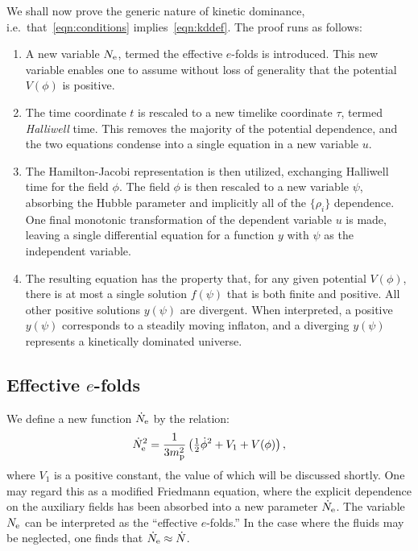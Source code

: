 We shall now prove the generic nature of kinetic dominance, i.e.\ that~\eqref{eqn:conditions} implies~\eqref{eqn:kddef}. The proof runs as follows:
%
\renewcommand{\theenumi}{\Alph{enumi}}
%
\begin{enumerate}
  \item                                        
    A new variable $N_\mathrm{e}$, termed the effective $e$-folds is introduced. This new variable enables one to assume without loss of generality that the potential $V(\phi)$ is positive.
  \item
    The time coordinate $t$ is rescaled to a new timelike coordinate $\tau$, termed {\em Halliwell\/} time. This removes the majority of the potential dependence, and the two equations condense into a single equation in a new variable $u$.
  \item
    The Hamilton-Jacobi representation is then utilized, exchanging Halliwell time for the field $\phi$. The field $\phi$ is then rescaled to a new variable $\psi$, absorbing the Hubble parameter and implicitly all of the $\{\rho_i\}$ dependence. One final monotonic transformation of the dependent variable $u$ is made, leaving a single differential equation for a function $y$ with $\psi$ as the independent variable.
  \item
    The resulting equation has the property that, for any given potential $V(\phi)$, there is at most a single solution $f(\psi)$ that is both finite and positive. All other positive solutions $y(\psi)$ are divergent.  When interpreted, a positive $y(\psi)$ corresponds to a steadily moving inflaton, and a diverging $y(\psi)$ represents a kinetically dominated universe.
\end{enumerate}
%


\subsection{Effective $e$-folds}
We define a new function $\dot{N}_\mathrm{e}$ by the relation:
%
\begin{equation}
  \dot{N}_\mathrm{e}^2 = 
  \frac{1}{3m_{\mathrm{p}}^2}\left({\textstyle\frac{1}{2}}\dot{\phi}^2 + V_1+V(\phi) \right),
  \label{eqn:Friedmann_c} 
\end{equation}
%
where $V_1$ is a positive constant, the value of which will be discussed shortly. One may regard this as a modified Friedmann equation, where the explicit dependence on the auxiliary fields has been absorbed into a new parameter $\dot{N}_\mathrm{e}$. The variable $N_\mathrm{e}$ can be interpreted as the ``effective $e$-folds.'' In the case where the fluids may be neglected, one finds that $\dot{N}_\mathrm{e}\approx\dot{N}$.

